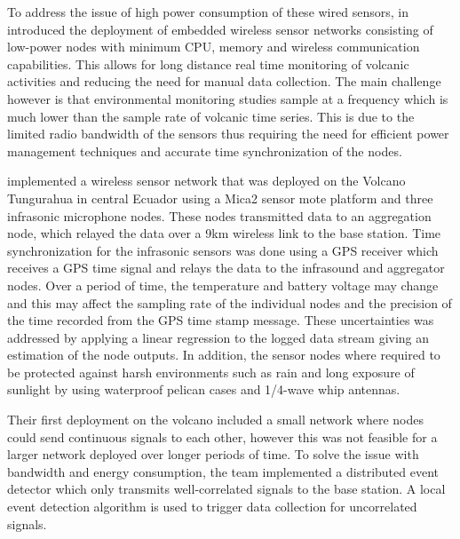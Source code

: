 To address the issue of high power consumption of these wired sensors, \citeauthor{Werner-Allen:2006:FYV:1298455.1298491} in \cite{Werner-Allen:2006:FYV:1298455.1298491} introduced the deployment of embedded wireless sensor networks consisting of low-power nodes with minimum CPU, memory and wireless communication capabilities. This allows for long distance real time monitoring of volcanic activities and reducing the need for manual data collection. The main challenge however is that environmental monitoring studies sample at a frequency which is much lower than the sample rate of volcanic time series. This is due to the limited radio bandwidth of the sensors thus requiring the need for efficient power management techniques and accurate time synchronization of the nodes. 

\citeauthor{Werner-Allen:2006:FYV:1298455.1298491} implemented a wireless sensor network that was deployed on the Volcano Tungurahua in central Ecuador using a Mica2 sensor mote platform and three infrasonic microphone nodes. These nodes transmitted data to an aggregation node, which relayed the data over a 9km wireless link to the base station. Time synchronization for the infrasonic sensors was done using a GPS receiver which receives a GPS time signal and relays the data to the infrasound and aggregator nodes. Over a period of time, the temperature and battery voltage may change and this may affect the sampling rate of the individual nodes and the precision of the time recorded from the GPS time stamp message. These uncertainties was addressed by applying a linear regression to the logged data stream giving an estimation of the node outputs. In addition, the sensor nodes where required to be protected against harsh environments such as rain and long exposure of sunlight by using waterproof pelican cases and 1/4-wave whip antennas.

Their first deployment on the volcano included a small network where nodes could send continuous signals to each other, however this was not feasible for a larger network deployed over longer periods of time. To solve the issue with bandwidth and energy consumption, the team implemented a distributed event detector which only transmits well-correlated signals to the base station. A local event detection algorithm is used to trigger data collection for uncorrelated signals.

